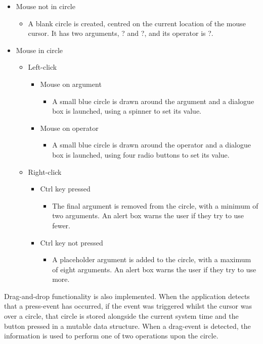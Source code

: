 \documentclass[12pt,twoside,notitlepage,xetex]{report}
\begin{document}
\begin{itemize}
\item Mouse not in circle
\begin{itemize}
\item A blank circle is created, centred on the current location of the mouse cursor.  It has two arguments, {\sfapp ?} and {\sfapp ?}, and its operator is {\sfapp ?}.
\end{itemize}
\item Mouse in circle
\begin{itemize}
\item Left-click
\begin{itemize}
\item Mouse on argument
\begin{itemize}
\item A small blue circle is drawn around the argument and a dialogue box is launched, using a spinner to set its value.
\end{itemize}
\item Mouse on operator
\begin{itemize}
\item A small blue circle is drawn around the operator and a dialogue box is launched, using four radio buttons to set its value.
\end{itemize}
\end{itemize}
\item Right-click
\begin{itemize}
\item Ctrl key pressed
\begin{itemize}
\item The final argument is removed from the circle, with a minimum of two arguments.  An alert box warns the user if they try to use fewer.
\end{itemize}
\item Ctrl key not pressed
\begin{itemize}
\item A placeholder argument is added to the circle, with a maximum of eight arguments.  An alert box warns the user if they try to use more.
\end{itemize}
\end{itemize}
\end{itemize}
\end{itemize}

Drag-and-drop functionality is also implemented.  When the application detects that a press-event has occurred, if the event was triggered whilst the cursor was over a circle, that circle is stored alongside the current system time and the button pressed in a mutable data structure.  When a drag-event is detected, the information is used to perform one of two operations upon the circle.
\end{document}
